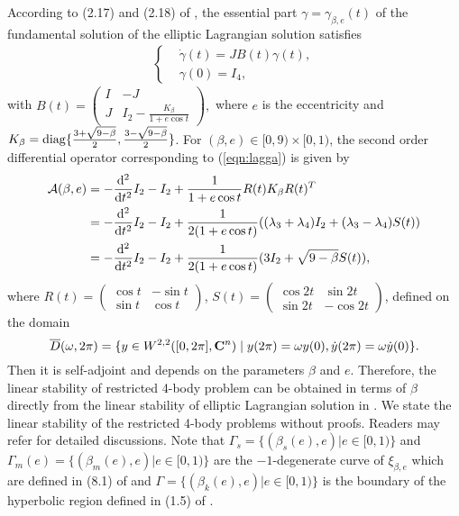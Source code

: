 \documentclass[11pt]{article}
\def\nn{\nonumber}
\def\lb{\label}
\def\d{{\mathrm{d}}}
\def\C{{\bf C}}
\def\bb{{\beta}}
\def\om{{\omega}}
\def\cA{{\cal A}}
\def\diag{{\rm diag}}
\def\ol#1{\overline{#1}}
\begin{document}
According to (2.17) and (2.18) of \cite{HLS}, the essential part $\gamma=\gamma_{\beta, e}(t)$ of the fundamental solution of the elliptic Lagrangian solution satisfies
\begin{align}
\begin{cases}
&\dot{\gamma}(t)=J B(t) \gamma(t), \\
&\gamma(0)=I_{4},
\end{cases}\lb{eqn:lagga}
\end{align}
with
$B(t)=\left(\begin{smallmatrix}
I & -J \\
J & I_2 - \frac{K_{\beta}}{1+e\cos t}
\end{smallmatrix}\right),
$
where $e$ is the eccentricity and $K_{\beta}=\diag\{\frac{3+\sqrt{9-\beta} }{2}, \frac{3-\sqrt{9-\beta}}{2}\}$.
 For $(\beta, e) \in[0,9) \times[0,1)$, the second order differential operator corresponding to (\ref{eqn:lagga}) is given by
\begin{align}\lb{eqn:ca}
  \cA(\bb, e) &= -\frac{\d^2}{\d t^2}I_2  -I_2 + \frac{1}{1+e\cos t}R(t)K_{\bb}R(t)^T \nn \\
  &= -\frac{\d^2}{\d t^2}I_2  -I_2 + \frac{1}{2(1+e\cos t)}(
  (\lambda_3 + \lambda_4)I_2 + (\lambda_3 - \lambda_4) S(t))\\
  &= -\frac{\d^2}{\d t^2}I_2  -I_2 + \frac{1}{2(1+e\cos t)}(
       3I_2 + \sqrt{9 - \beta} S(t)),  \lb{cA}
\end{align}
where $R(t) = (\begin{smallmatrix}\cos t & -\sin t\\ \sin t & \cos t \end{smallmatrix})$,
$S(t) = (\begin{smallmatrix}
\cos 2t & \sin 2t\\ \sin 2t & -\cos 2t
\end{smallmatrix})$, defined on the domain
$$
\ol{D}(\om,2\pi)=\{y\in W^{2,2}([0,2\pi],\C^n)\;
|\;y(2\pi)=\om y(0),\dot{y}(2\pi)=\om\dot{y}(0)\}.
$$ 
Then it is self-adjoint and depends on the parameters $\beta$ and $e$. 
Therefore, the linear stability of restricted 4-body problem can be obtained in terms of $\beta$ directly from the linear stability of elliptic Lagrangian solution in \cite{HLS}. We state the linear stability of the restricted 4-body problems without proofs. Readers may refer \cite{HLS} for detailed discussions. Note that $\Gamma_s = \{(\beta_s(e), e)| e \in [0,1)\}$ and  $\Gamma_m(e) = \{(\beta_m(e),e )|e\in [0,1)\} $ are the $-1$-degenerate curve of $\xi_{\beta, e}$ which are defined in (8.1) of \cite{HLS} and $\Gamma = \{(\beta_k(e),e)|e\in[0,1)\}$ is the boundary of the hyperbolic region defined in (1.5) of \cite{HLS}.
\end{document}
